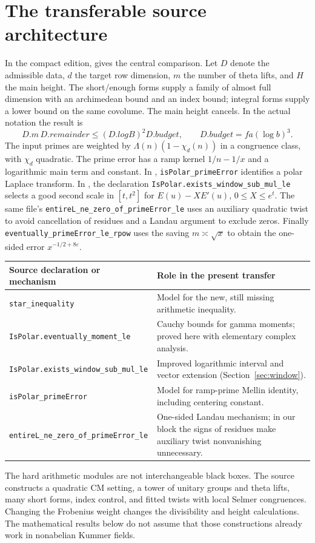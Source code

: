 \documentclass[11pt,letterpaper]{article}
\theoremstyle{definition}\newtheorem{definition}[theorem]{Definition}
\theoremstyle{remark}\newtheorem{remark}[theorem]{Remark}
\begin{document}
\section{The transferable source architecture}\label{sec:source}
In the compact edition,  gives the central comparison. Let $D$ denote the admissible data, $d$ the target row dimension, $m$ the number of theta lifts, and $H$ the main height. The short/enough forms supply a family of almost full dimension with an archimedean bound and an index bound; integral forms supply a lower bound on the same covolume. The main height cancels. In the actual notation the result is
\begin{equation}\label{eq:star}D.m\,D.remainder\le (D.logB)^2 D.budget,\qquad D.budget=f a(\log b)^3.\end{equation}
The input primes are weighted by $\Lambda(n)(1-\chi_d(n))$ in a congruence class, with $\chi_d$ quadratic. The prime error has a ramp kernel $1/n-1/x$ and a logarithmic main term and constant. In , \texttt{isPolar\_primeError} identifies a polar Laplace transform. In , the declaration \texttt{IsPolar.exists\_window\_sub\_mul\_le} selects a good second scale in $[t,t^2]$ for $E(u)-X E'(u)$, $0\le X\le e^t$. The same file's \texttt{entireL\_ne\_zero\_of\_primeError\_le} uses an auxiliary quadratic twist to avoid cancellation of residues and a Landau argument to exclude zeros. Finally \texttt{eventually\_primeError\_le\_rpow} uses the saving $m\asymp\sqrt{x}$ to obtain the one-sided error $x^{-1/2+8\varepsilon}$.

\begin{center}\small
\begin{tabular}{p{.43\linewidth}p{.49\linewidth}}\toprule
Source declaration or mechanism & Role in the present transfer\\\midrule
\texttt{star\_inequality} & Model for the new, still missing arithmetic inequality.\\
\texttt{IsPolar.eventually\_moment\_le} & Cauchy bounds for gamma moments; proved here with elementary complex analysis.\\
\texttt{IsPolar.exists\_window\_sub\_mul\_le} & Improved logarithmic interval and vector extension (Section~\ref{sec:window}).\\
\texttt{isPolar\_primeError} & Model for ramp-prime Mellin identity, including centering constant.\\
\texttt{entireL\_ne\_zero\_of\_primeError\_le} & One-sided Landau mechanism; in our block the signs of residues make auxiliary twist nonvanishing unnecessary.\\\bottomrule
\end{tabular}\end{center}
The hard arithmetic modules are not interchangeable black boxes. The source constructs a quadratic CM setting, a tower of unitary groups and theta lifts, many short forms, index control, and fitted twists with local Selmer congruences. Changing the Frobenius weight changes the divisibility and height calculations. The mathematical results below do not assume that those constructions already work in nonabelian Kummer fields.
\end{document}

